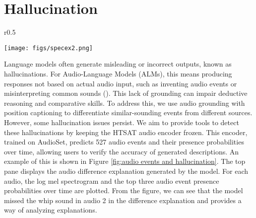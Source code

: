 \vspace{-0.1in}
\section{Hallucination} \vspace{-0.1in}
\begin{wrapfigure}[18]{r}{0.5\textwidth}
\begin{center}
     \vspace{-0.15in}
    \texttt{[image: figs/specex2.png]}
     \caption{\small Audio event presence probabilities from ADIFF to detect hallucinations. 
     }
     \label{fig:audio events and hallucination}
\end{center}
\end{wrapfigure}
Language models often generate misleading or incorrect outputs, known as hallucinations. For Audio-Language Models (ALMs), this means producing responses not based on actual audio input, such as inventing audio events or misinterpreting common sounds (\cite{kuan24_interspeech, nishimura2024audio}). This lack of grounding can impair deductive reasoning and comparative skills. To address this, we use audio grounding with position captioning to differentiate similar-sounding events from different sources. However, some hallucination issues persist. We aim to provide tools to detect these hallucinations by keeping the HTSAT audio encoder frozen. This encoder, trained on AudioSet, predicts 527 audio events and their presence probabilities over time, allowing users to verify the accuracy of generated descriptions. An example of this is shown in Figure \ref{fig:audio events and hallucination}. The top pane displays the audio difference explanation generated by the model. For each audio, the log mel spectrogram and the top three audio event presence probabilities over time are plotted. From the figure, we can see that the model missed the whip sound in audio 2 in the difference explanation and provides a way of analyzing explanations.